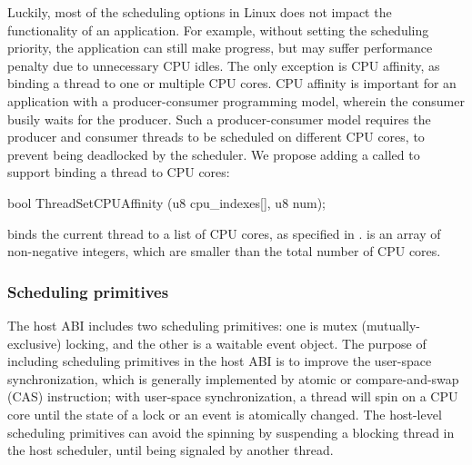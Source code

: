 Luckily, most of the scheduling options in Linux does not impact
the functionality of an application.
For example, without setting the scheduling priority,
the application can still make progress,
but may suffer performance penalty due to unnecessary CPU idles.
The only exception is CPU affinity, as binding a thread to one or multiple CPU cores.
CPU affinity is important
for an application with a producer-consumer programming model,
wherein the consumer busily waits for the producer.
Such a producer-consumer model requires the producer and consumer threads to be scheduled on different CPU cores, to prevent being deadlocked by the scheduler.
We propose adding a \hostapi{} called 
to support binding a thread to CPU cores:

\begin{paldef}
bool ThreadSetCPUAffinity (u8 cpu_indexes[], u8 num);
\end{paldef}

 binds the current thread to a list of CPU cores, as specified in .
 is an array of non-negative integers, which are smaller than the total number of CPU cores.



\subsubsection*{Scheduling primitives}


The host ABI includes two scheduling primitives: one is mutex (mutually-exclusive) locking, and the other is a waitable event object.
The purpose of including scheduling primitives in the host ABI
is to improve the user-space synchronization, which is generally implemented
by atomic or compare-and-swap (CAS) instruction;
with user-space synchronization, a thread will spin on a CPU core until the state of a lock or an event
is atomically changed.
The host-level scheduling primitives
can avoid the spinning
by suspending a blocking thread in the host scheduler,
until being signaled by another thread.





